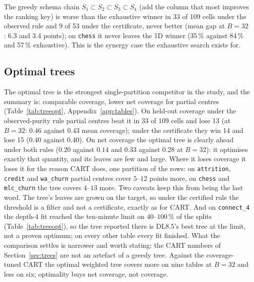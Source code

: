 \documentclass[11pt]{article}
\begin{document}
The greedy schema chain $S_1\subset S_2\subset S_3\subset S_4$ (add the column that most improves the ranking key) is worse than the exhaustive winner in 33 of 109 cells under the observed rule and 9 of 53 under the certificate, never better (mean gap at $B=32$: 6.3 and 3.4 points); on \texttt{chess} it never leaves the 1D winner (35\,\% against 84\,\% and 57\,\% exhaustive). This is the synergy case the exhaustive search exists for.

\subsection{Optimal trees}\label{sec:treeopt}

The optimal tree is the strongest single-partition competitor in the study, and the summary is: comparable coverage, lower net coverage for partial centres (Table~\ref{tab:treeopt}, Appendix~\ref{app:tables}). On held-out coverage under the observed-purity rule partial centres beat it in 33 of 109 cells and lose 13 (at $B=32$: $0.46$ against $0.43$ mean coverage); under the certificate they win 14 and lose 15 ($0.40$ against $0.40$). On net coverage the optimal tree is clearly ahead under both rules ($0.20$ against $0.14$ and $0.33$ against $0.28$ at $B=32$): it optimises exactly that quantity, and its leaves are few and large. Where it loses coverage it loses it for the reason CART does, one partition of the rows: on \texttt{attrition}, \texttt{credit} and \texttt{wa\_churn} partial centres cover $5$--$12$ points more, on \texttt{chess} and \texttt{mlc\_churn} the tree covers $4$--$13$ more. Two caveats keep this from being the last word. The tree's leaves are grown on the target, so under the certified rule the threshold is a filter and not a certificate, exactly as for CART. And on \texttt{connect\_4} the depth-4 fit reached the ten-minute limit on $40$--$100\,\%$ of the splits (Table~\ref{tab:treeopt}), so the tree reported there is DL8.5's best tree at the limit, not a proven optimum; on every other table every fit finished. What the comparison settles is narrower and worth stating: the CART numbers of Section~\ref{sec:trees} are not an artefact of a greedy tree. Against the coverage-tuned CART the optimal weighted tree covers more on nine tables at $B=32$ and less on six; optimality buys net coverage, not coverage.
\end{document}
